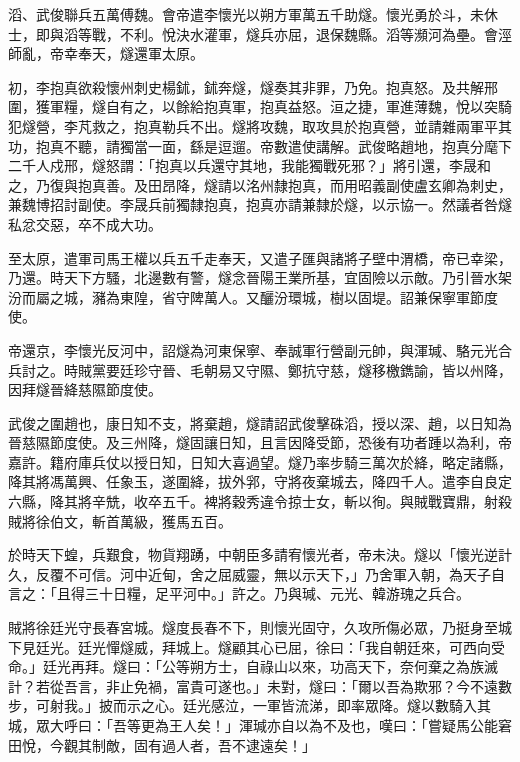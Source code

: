 \begin{pinyinscope}
 滔、武俊聯兵五萬傅魏。會帝遣李懷光以朔方軍萬五千助燧。懷光勇於斗，未休士，即與滔等戰，不利。悅決水灌軍，燧兵亦屈，退保魏縣。滔等瀕河為壘。會涇師亂，帝幸奉天，燧還軍太原。



 初，李抱真欲殺懷州刺史楊鉥，鉥奔燧，燧奏其非罪，乃免。抱真怒。及共解邢圍，獲軍糧，燧自有之，以餘給抱真軍，抱真益怒。洹之捷，軍進薄魏，悅以突騎犯燧營，李芃救之，抱真勒兵不出。燧將攻魏，取攻具於抱真營，並請雜兩軍平其功，抱真不聽，請獨當一面，繇是逗遛。帝數遣使講解。武俊略趙地，抱真分麾下二千人戍邢，燧怒謂：「抱真以兵還守其地，我能獨戰死邪？」將引還，李晟和之，乃復與抱真善。及田昂降，燧請以洺州隸抱真，而用昭義副使盧玄卿為刺史，兼魏博招討副使。李晟兵前獨隸抱真，抱真亦請兼隸於燧，以示協一。然議者咎燧私忿交惡，卒不成大功。



 至太原，遣軍司馬王權以兵五千走奉天，又遣子匯與諸將子壁中渭橋，帝已幸梁，乃還。時天下方騷，北邊數有警，燧念晉陽王業所基，宜固險以示敵。乃引晉水架汾而屬之城，瀦為東隍，省守陴萬人。又釃汾環城，樹以固堤。詔兼保寧軍節度使。



 帝還京，李懷光反河中，詔燧為河東保寧、奉誠軍行營副元帥，與渾瑊、駱元光合兵討之。時賊黨要廷珍守晉、毛朝易又守隰、鄭抗守慈，燧移檄鐫諭，皆以州降，因拜燧晉絳慈隰節度使。



 武俊之圍趙也，康日知不支，將棄趙，燧請詔武俊擊硃滔，授以深、趙，以日知為晉慈隰節度使。及三州降，燧固讓日知，且言因降受節，恐後有功者踵以為利，帝嘉許。籍府庫兵仗以授日知，日知大喜過望。燧乃率步騎三萬次於絳，略定諸縣，降其將馮萬興、任象玉，遂圍絳，拔外郛，守將夜棄城去，降四千人。遣李自良定六縣，降其將辛兟，收卒五千。裨將穀秀違令掠士女，斬以徇。與賊戰寶鼎，射殺賊將徐伯文，斬首萬級，獲馬五百。



 於時天下蝗，兵艱食，物貨翔踴，中朝臣多請宥懷光者，帝未決。燧以「懷光逆計久，反覆不可信。河中近甸，舍之屈威靈，無以示天下，」乃舍軍入朝，為天子自言之：「且得三十日糧，足平河中。」許之。乃與瑊、元光、韓游瑰之兵合。



 賊將徐廷光守長春宮城。燧度長春不下，則懷光固守，久攻所傷必眾，乃挺身至城下見廷光。廷光憚燧威，拜城上。燧顧其心已屈，徐曰：「我自朝廷來，可西向受命。」廷光再拜。燧曰：「公等朔方士，自祿山以來，功高天下，奈何棄之為族滅計？若從吾言，非止免禍，富貴可遂也。」未對，燧曰：「爾以吾為欺邪？今不遠數步，可射我。」披而示之心。廷光感泣，一軍皆流涕，即率眾降。燧以數騎入其城，眾大呼曰：「吾等更為王人矣！」渾瑊亦自以為不及也，嘆曰：「嘗疑馬公能窘田悅，今觀其制敵，固有過人者，吾不逮遠矣！」




\end{pinyinscope}
